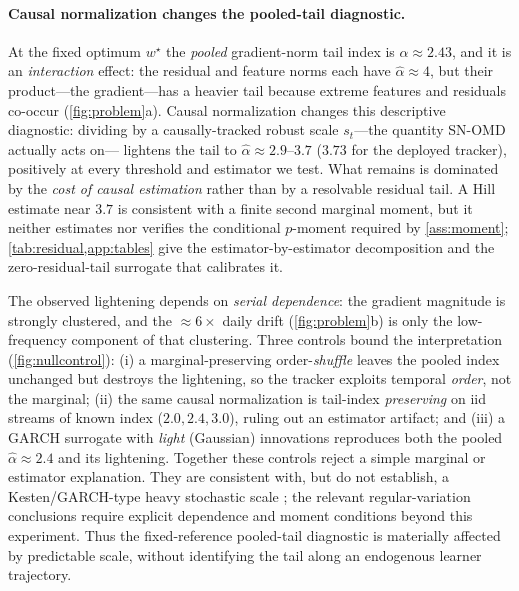 \documentclass{article}
\begin{document}

\paragraph{Causal normalization changes the pooled-tail diagnostic.} At the fixed optimum
$w^\star$ the \emph{pooled} gradient-norm tail index is $\hat\alpha\approx2.43$, and it is an
\emph{interaction} effect: the residual and feature norms each have $\hat\alpha\approx4$, but
their product---the gradient---has a heavier tail because extreme features and residuals
co-occur (\cref{fig:problem}a). Causal normalization changes this descriptive diagnostic:
dividing by a causally-tracked robust scale $s_t$---the quantity SN-OMD actually acts on---%
lightens the tail to $\hat\alpha\approx2.9$--$3.7$ ($3.73$ for the deployed tracker), positively
at every threshold and estimator we test. What remains is dominated by the \emph{cost of causal
estimation} rather than by a resolvable residual tail. A Hill estimate near $3.7$ is consistent
with a finite second marginal moment, but it neither estimates nor verifies the conditional
$p$-moment required by \cref{ass:moment};
\cref{tab:residual,app:tables} give the estimator-by-estimator decomposition and the
zero-residual-tail surrogate that calibrates it.

The observed lightening depends on \emph{serial dependence}: the gradient magnitude is strongly
clustered, and the $\approx6\times$ daily drift (\cref{fig:problem}b) is only the low-frequency
component of that clustering. Three controls bound the interpretation (\cref{fig:nullcontrol}):
(i) a marginal-preserving order-\emph{shuffle} leaves the pooled index unchanged but destroys
the lightening, so the tracker exploits temporal \emph{order}, not the marginal; (ii) the same
causal normalization is tail-index \emph{preserving} on iid streams of known index
($2.0,2.4,3.0$), ruling out an estimator artifact; and (iii) a GARCH surrogate with \emph{light}
(Gaussian) innovations reproduces both the pooled $\hat\alpha\approx2.4$ and its lightening.
Together these controls reject a simple marginal or estimator explanation. They are consistent
with, but do not establish, a Kesten/GARCH-type heavy stochastic scale
\citep{kesten1973,basrak2002garch}; the relevant regular-variation conclusions require explicit
dependence and moment conditions beyond this experiment. Thus the fixed-reference pooled-tail
diagnostic is materially affected by predictable scale, without identifying the tail along an
endogenous learner trajectory.
\end{document}
